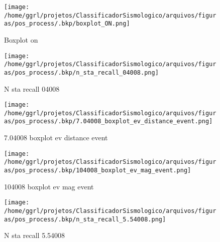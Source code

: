                     \begin{figure}[H]
                        \centering
                        \texttt{[image: /home/ggrl/projetos/ClassificadorSismologico/arquivos/figuras/pos\_process/.bkp/boxplot\_ON.png]}
                        \caption{Boxplot on}
                        \label{fig:boxplot_ON}
                    \end{figure}
                

                    \begin{figure}[H]
                        \centering
                        \texttt{[image: /home/ggrl/projetos/ClassificadorSismologico/arquivos/figuras/pos\_process/.bkp/n\_sta\_recall\_04008.png]}
                        \caption{N sta recall 04008}
                        \label{fig:n_sta_recall_04008}
                    \end{figure}
                

                    \begin{figure}[H]
                        \centering
                        \texttt{[image: /home/ggrl/projetos/ClassificadorSismologico/arquivos/figuras/pos\_process/.bkp/7.04008\_boxplot\_ev\_distance\_event.png]}
                        \caption{7.04008 boxplot ev distance event}
                        \label{fig:7.04008_boxplot_ev_distance_event}
                    \end{figure}
                

                    \begin{figure}[H]
                        \centering
                        \texttt{[image: /home/ggrl/projetos/ClassificadorSismologico/arquivos/figuras/pos\_process/.bkp/104008\_boxplot\_ev\_mag\_event.png]}
                        \caption{104008 boxplot ev mag event}
                        \label{fig:104008_boxplot_ev_mag_event}
                    \end{figure}
                

                    \begin{figure}[H]
                        \centering
                        \texttt{[image: /home/ggrl/projetos/ClassificadorSismologico/arquivos/figuras/pos\_process/.bkp/n\_sta\_recall\_5.54008.png]}
                        \caption{N sta recall 5.54008}
                        \label{fig:n_sta_recall_5.54008}
                    \end{figure}
                

